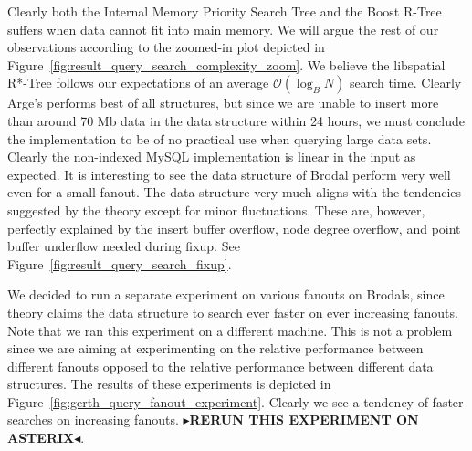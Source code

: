 \documentclass[twoside,11pt,openright]{report}
\newcommand{\todo}[1]{{\color[rgb]{.5,0,0}\textbf{$\blacktriangleright$#1$\blacktriangleleft$}}}
\begin{document}
Clearly both the Internal Memory Priority Search Tree and the Boost R-Tree suffers when data cannot fit into main memory. We will argue the rest of our observations according to the zoomed-in plot depicted in Figure~\ref{fig:result_query_search_complexity_zoom}. We believe the libspatial R*-Tree follows our expectations of an average $\mathcal{O}(\log_B N)$ search time. Clearly Arge's performs best of all structures, but since we are unable to insert more than around 70 Mb data in the data structure within 24 hours, we must conclude the implementation to be of no practical use when querying large data sets. Clearly the non-indexed MySQL implementation is linear in the input as expected. It is interesting to see the data structure of Brodal perform very well even for a small fanout. The data structure very much aligns with the tendencies suggested by the theory except for minor fluctuations. These are, however, perfectly explained by the insert buffer overflow, node degree overflow, and point buffer underflow needed during fixup. See Figure~\ref{fig:result_query_search_fixup}.

We decided to run a separate experiment on various fanouts on Brodals, since theory claims the data structure to search ever faster on ever increasing fanouts.
Note that we ran this experiment on a different machine. This is not a problem since we are aiming at experimenting on the relative performance between different fanouts opposed to the relative performance between different data structures. The results of these experiments is depicted in Figure~\ref{fig:gerth_query_fanout_experiment}.
Clearly we see a tendency of faster searches on increasing fanouts. \todo{RERUN THIS EXPERIMENT ON ASTERIX}.
\end{document}
